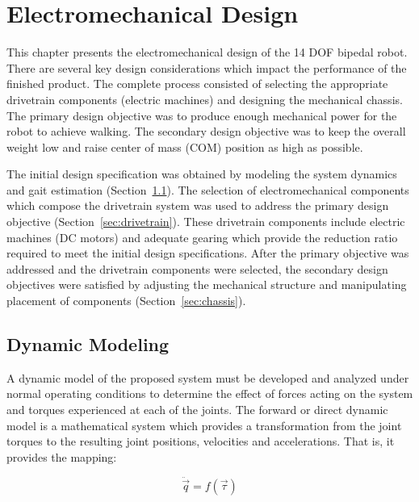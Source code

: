 \chapter{Electromechanical Design} %
\label{cha:design}

This chapter presents the electromechanical design of the 14 DOF bipedal robot. There are several key design considerations which impact the performance of the finished product. The complete process consisted of selecting the appropriate drivetrain components (electric machines) and designing the mechanical chassis. The primary design objective was to produce enough mechanical power for the robot to achieve walking. The secondary design objective was to keep the overall weight low and raise center of mass (COM) position as high as possible. 

The initial design specification was obtained by modeling the system dynamics and gait estimation (Section~\ref{sec:designspec}). The selection of electromechanical components which compose the drivetrain system was used to address the primary design objective (Section~\ref{sec:drivetrain}). These drivetrain components include electric machines (DC motors) and adequate gearing which provide the reduction ratio required to meet the initial design specifications. After the primary objective was addressed and the drivetrain components were selected, the secondary design objectives were satisfied by adjusting the mechanical structure and manipulating placement of components (Section~\ref{sec:chassis}).


\section{Dynamic Modeling} %
\label{sec:designspec}

A dynamic model of the proposed system must be developed and analyzed under normal operating conditions to determine the effect of forces acting on the system and torques experienced at each of the joints. The forward or direct dynamic model is a mathematical system which provides a transformation from the joint torques to the resulting joint positions, velocities and accelerations. That is, it provides the mapping:

\begin{equation}
	\ddot{\vec{q}} = f(\vec{\tau})
\end{equation}


